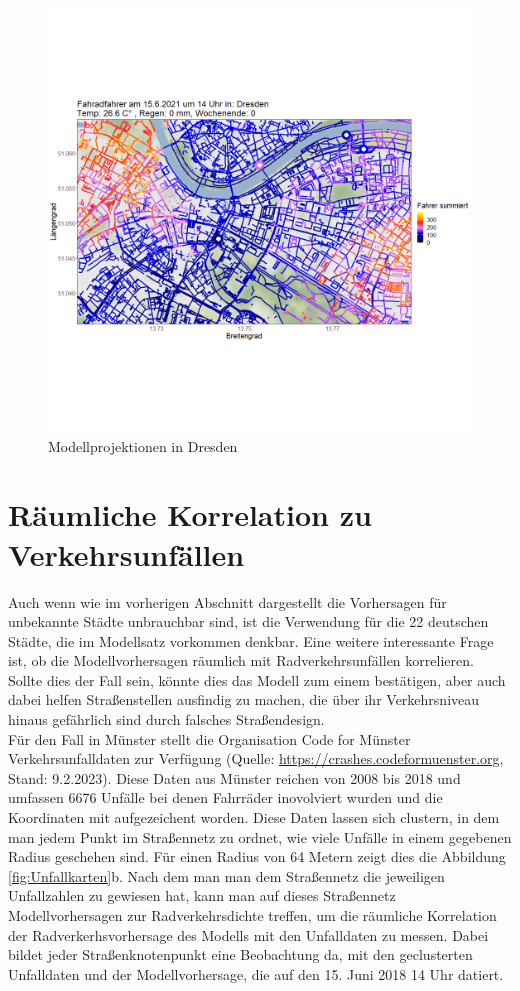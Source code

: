 \documentclass[a4paper,12pt]{thesis}
\begin{document}
\begin{figure}[!ht]
	\centering
	\includegraphics[width=\textwidth]{Plots/Dresden.png}
	\caption{Modellprojektionen in Dresden}
	\label{Dresden}
\end{figure}

\section{Räumliche Korrelation zu Verkehrsunfällen}

Auch wenn wie im vorherigen Abschnitt dargestellt die Vorhersagen für unbekannte Städte unbrauchbar sind, ist die Verwendung für die 22 deutschen Städte, die im Modellsatz vorkommen denkbar. Eine weitere interessante Frage ist, ob die Modellvorhersagen räumlich mit Radverkehrsunfällen korrelieren. Sollte dies der Fall sein, könnte dies das Modell zum einem bestätigen, aber auch dabei helfen Straßenstellen ausfindig zu machen, die über ihr Verkehrsniveau hinaus gefährlich sind durch falsches Straßendesign.\\
Für den Fall in Münster stellt die Organisation Code for Münster Verkehrsunfalldaten zur Verfügung (Quelle: \url{https://crashes.codeformuenster.org}, Stand: 9.2.2023). Diese Daten aus Münster reichen von 2008 bis 2018 und umfassen 6676 Unfälle bei denen Fahrräder inovolviert wurden und die Koordinaten mit aufgezeichent worden. Diese Daten lassen sich clustern, in dem man jedem Punkt im Straßennetz zu ordnet, wie viele Unfälle in einem gegebenen Radius geschehen sind. Für einen Radius von 64 Metern zeigt dies die Abbildung \ref{fig:Unfallkarten}b. Nach dem man man dem Straßennetz die jeweiligen Unfallzahlen zu gewiesen hat, kann man auf dieses Straßennetz Modellvorhersagen zur Radverkehrsdichte treffen, um die räumliche Korrelation der Radverkerhsvorhersage des Modells mit den Unfalldaten zu messen. Dabei bildet jeder Straßenknotenpunkt eine Beobachtung da, mit den geclusterten Unfalldaten und der Modellvorhersage, die auf den 15. Juni 2018 14 Uhr datiert.\\
\end{document}
